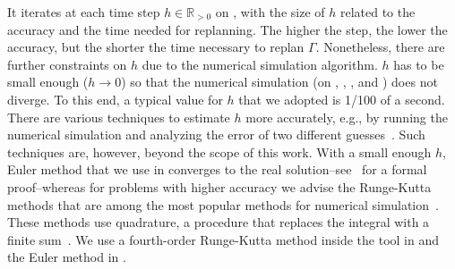 It iterates at each time step $h\in\mathbb{R}_{>0}$ on , with the size of $h$ related to the accuracy and the time needed for replanning. The higher the step, the lower the accuracy, but the shorter the time necessary to replan $\Gamma$. Nonetheless, there are further constraints on $h$ due to the numerical simulation algorithm. $h$ has to be small enough ($h\rightarrow 0$) so that the numerical simulation (on , , , and ) does not diverge. To this end, a typical value for $h$ that we adopted is 1/100 of a second. There are various techniques to estimate $h$ more accurately, e.g., by running the numerical simulation and analyzing the error of two different guesses~\citep{iserles2009first}. Such techniques are, however, beyond the scope of this work. With a small enough $h$, Euler method that we use in  converges to the real solution--see~\citep{iserles2009first,atkinson2009euler} for a formal proof--whereas for problems with higher accuracy we advise the Runge-Kutta methods that are among the most popular methods for numerical simulation~\citep{atkinson2009euler}. These methods use quadrature, a procedure that replaces the integral with a finite sum~\citep{iserles2009first}. We use a fourth-order Runge-Kutta method inside the \powprof{} tool in  and the Euler method in .

